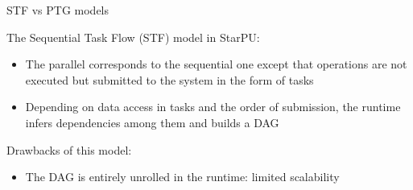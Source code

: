 \documentclass{beamer}
\newcommand{\db}[1]{\textcolor{amblu}{#1}}
\begin{document}
\begin{frame}{STF vs PTG models}

  The \alert{Sequential Task Flow} (STF) model in StarPU:
    \begin{itemize}
    \item The parallel corresponds to the sequential one except that
      operations are not executed but \db{submitted} to the system in
      the form of \alert{tasks}
    \item Depending on data access in tasks and the order of
      submission, the runtime \db{infers} dependencies among them and
      builds a DAG
    \end{itemize}


    \alert{Drawbacks} of this model:
    \begin{itemize}
    \item The DAG is entirely unrolled in the runtime: \alert{limited
      scalability}
    \end{itemize}



\end{frame}
\end{document}
